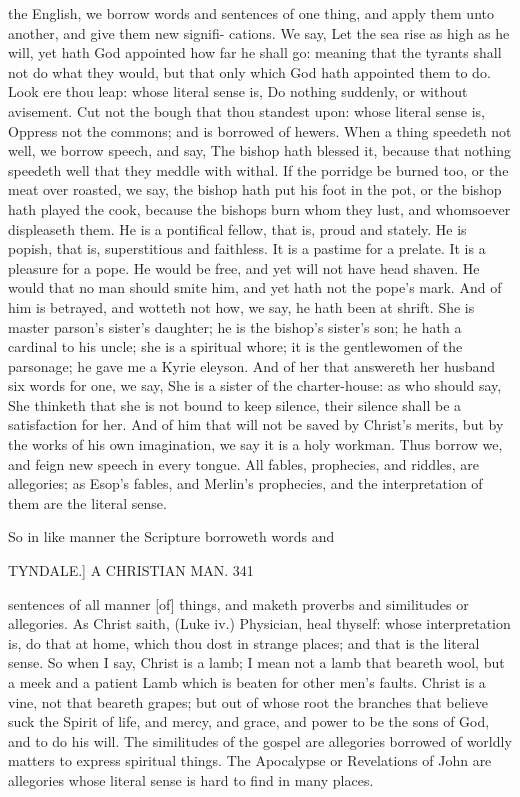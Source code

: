 \documentclass{custom}
\begin{document}
{the English, we borrow words and sentences of one thing, 
and apply them unto another, and give them new signifi- 
cations. We say, Let the sea rise as high as he will, yet 
hath God appointed how far he shall go: meaning that 
the tyrants shall not do what they would, but that only 
which God hath appointed them to do. Look ere thou leap: 
whose literal sense is, Do nothing suddenly, or without 
avisement. Cut not the bough that thou standest upon: 
whose literal sense is, Oppress not the commons; and is 
borrowed of hewers. When a thing speedeth not well, we 
borrow speech, and say, The bishop hath blessed it, because 
that nothing speedeth well that they meddle with withal. 
If the porridge be burned too, or the meat over roasted, 
we say, the bishop hath put his foot in the pot, or the 
bishop hath played the cook, because the bishops burn 
whom they lust, and whomsoever displeaseth them. He is a 
pontifical fellow, that is, proud and stately. He is popish, 
that is, superstitious and faithless. It is a pastime for a 
prelate. It is a pleasure for a pope. He would be free, 
and yet will not have head shaven. He would that no 
man should smite him, and yet hath not the pope's mark. 
And of him is betrayed, and wotteth not how, we say, he 
hath been at shrift. She is master parson's sister's daughter; 
he is the bishop's sister's son; he hath a cardinal to his 
uncle; she is a spiritual whore; it is the gentlewomen of 
the parsonage; he gave me a Kyrie eleyson. And of her 
that answereth her husband six words for one, we say, 
She is a sister of the charter-house: as who should say, 
She thinketh that she is not bound to keep silence, their 
silence shall be a satisfaction for her. And of him that 
will not be saved by Christ's merits, but by the works of 
his own imagination, we say it is a holy workman. Thus 
borrow we, and feign new speech in every tongue. All 
fables, prophecies, and riddles, are allegories; as Esop's 
fables, and Merlin's prophecies, and the interpretation of 
them are the literal sense. 

So in like manner the Scripture borroweth words and 


TYNDALE.] A CHRISTIAN MAN. 341

sentences of all manner [of] things, and maketh proverbs 
and similitudes or allegories. As Christ saith, (Luke iv.) 
Physician, heal thyself: whose interpretation is, do that at 
home, which thou dost in strange places; and that is the 
literal sense. So when I say, Christ is a lamb; I mean 
not a lamb that beareth wool, but a meek and a patient 
Lamb which is beaten for other men's faults. Christ is a 
vine, not that beareth grapes; but out of whose root the 
branches that believe suck the Spirit of life, and mercy, 
and grace, and power to be the sons of God, and to do 
his will. The similitudes of the gospel are allegories
borrowed of worldly matters to express spiritual things.
The Apocalypse or Revelations of John are allegories 
whose literal sense is hard to find in many places. 

}
\end{document}
